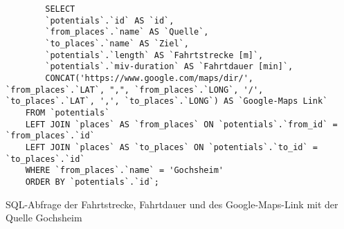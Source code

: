 \begin{listing}[htbp]
    \begin{verbatim}
        SELECT 
        `potentials`.`id` AS `id`, 
        `from_places`.`name` AS `Quelle`,
        `to_places`.`name` AS `Ziel`, 
        `potentials`.`length` AS `Fahrtstrecke [m]`, 
        `potentials`.`miv-duration` AS `Fahrtdauer [min]`,
        CONCAT('https://www.google.com/maps/dir/', `from_places`.`LAT`, ",", `from_places`.`LONG`, '/', `to_places`.`LAT`, ',', `to_places`.`LONG`) AS `Google-Maps Link`
    FROM `potentials`
    LEFT JOIN `places` AS `from_places` ON `potentials`.`from_id` = `from_places`.`id`
    LEFT JOIN `places` AS `to_places` ON `potentials`.`to_id` = `to_places`.`id`
    WHERE `from_places`.`name` = 'Gochsheim'
    ORDER BY `potentials`.`id`;
    \end{verbatim}
    \caption{SQL-Abfrage der Fahrtstrecke, Fahrtdauer und des Google-Maps-Link mit der Quelle Gochsheim}\label{lst-f-gochsheim}
\end{listing}